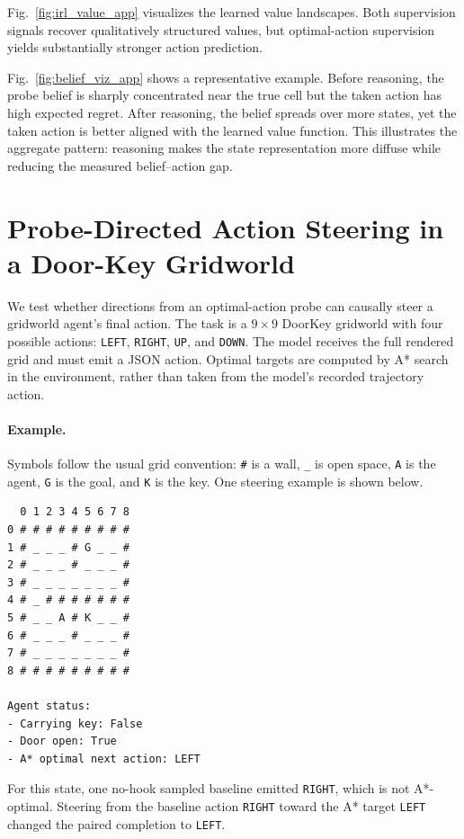 \documentclass[10pt,twocolumn]{article}
\begin{document}
Fig.~\ref{fig:irl_value_app} visualizes the learned value landscapes. Both
supervision signals recover qualitatively structured values, but optimal-action
supervision yields substantially stronger action prediction.

Fig.~\ref{fig:belief_viz_app} shows a representative example. Before
reasoning, the probe belief is sharply concentrated near the true cell but the
taken action has high expected regret. After reasoning, the belief spreads
over more states, yet the taken action is better aligned with the learned
value function. This illustrates the aggregate pattern: reasoning makes the
state representation more diffuse while reducing the measured belief--action
gap.


\section{Probe-Directed Action Steering in a Door-Key Gridworld}
\label{app:probe_steering}

We test whether directions from an optimal-action probe can causally steer a
gridworld agent's final action. The task is a $9{\times}9$ DoorKey gridworld
with four possible actions: \texttt{LEFT}, \texttt{RIGHT}, \texttt{UP}, and
\texttt{DOWN}. The model receives the full rendered grid and must emit a JSON
action. Optimal targets are computed by A* search in the environment, rather
than taken from the model's recorded trajectory action.

\paragraph{Example.}
Symbols follow the usual grid convention: \texttt{\#} is a wall, \texttt{\_} is
open space, \texttt{A} is the agent, \texttt{G} is the goal, and \texttt{K} is
the key. One steering example is shown below.

\begin{verbatim}
  0 1 2 3 4 5 6 7 8
0 # # # # # # # # #
1 # _ _ _ # G _ _ #
2 # _ _ _ # _ _ _ #
3 # _ _ _ _ _ _ _ #
4 # _ # # # # # # #
5 # _ _ A # K _ _ #
6 # _ _ _ # _ _ _ #
7 # _ _ _ _ _ _ _ #
8 # # # # # # # # #

Agent status:
- Carrying key: False
- Door open: True
- A* optimal next action: LEFT
\end{verbatim}

For this state, one no-hook sampled baseline emitted \texttt{RIGHT}, which is
not A*-optimal. Steering from the baseline action \texttt{RIGHT} toward the
A* target \texttt{LEFT} changed the paired completion to \texttt{LEFT}.
\end{document}
